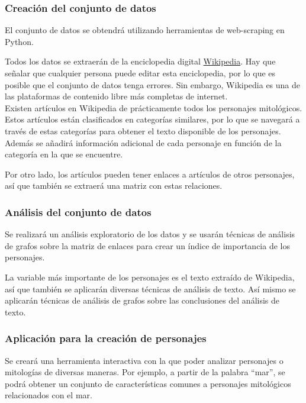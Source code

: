 \documentclass[letterpaper,9pt,twocolumn,twoside,]{pinp}
\begin{document}
\hypertarget{creaciuxf3n-del-conjunto-de-datos}{%
\subsubsection{Creación del conjunto de
datos}\label{creaciuxf3n-del-conjunto-de-datos}}

El conjunto de datos se obtendrá utilizando herramientas de web-scraping
en Python.

Todos los datos se extraerán de la enciclopedia digital
\href{https://wikipedia.es}{Wikipedia}. Hay que señalar que cualquier
persona puede editar esta enciclopedia, por lo que es posible que el
conjunto de datos tenga errores. Sin embargo, Wikipedia es una de las
plataformas de contenido libre más completas de internet.\\
Existen artículos en Wikipedia de prácticamente todos los personajes
mitológicos. Estos artículos están clasificados en categorías similares,
por lo que se navegará a través de estas categorías para obtener el
texto disponible de los personajes. Además se añadirá información
adicional de cada personaje en función de la categoría en la que se
encuentre.

Por otro lado, los artículos pueden tener enlaces a artículos de otros
personajes, así que también se extraerá una matriz con estas relaciones.

\hypertarget{anuxe1lisis-del-conjunto-de-datos}{%
\subsubsection{Análisis del conjunto de
datos}\label{anuxe1lisis-del-conjunto-de-datos}}

Se realizará un análisis exploratorio de los datos y se usarán técnicas
de análisis de grafos sobre la matriz de enlaces para crear un índice de
importancia de los personajes.

La variable más importante de los personajes es el texto extraído de
Wikipedia, así que también se aplicarán diversas técnicas de análisis de
texto. Así mismo se aplicarán técnicas de análisis de grafos sobre las
conclusiones del análisis de texto.

\hypertarget{aplicaciuxf3n-para-la-creaciuxf3n-de-personajes}{%
\subsubsection{Aplicación para la creación de
personajes}\label{aplicaciuxf3n-para-la-creaciuxf3n-de-personajes}}

Se creará una herramienta interactiva con la que poder analizar
personajes o mitologías de diversas maneras. Por ejemplo, a partir de la
palabra ``mar'', se podrá obtener un conjunto de características comunes
a personajes mitológicos relacionados con el mar.

\showacknow




\end{document}
